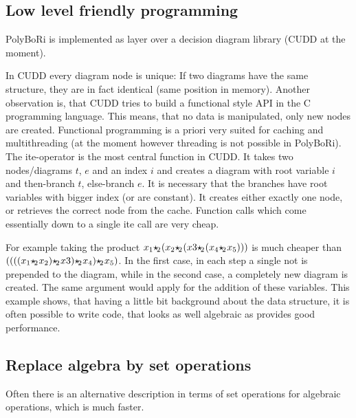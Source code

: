 \documentclass[]{article}
\newcommand{\PolyBoRi}{{\sc PolyBoRi}\xspace}
\newcommand{\CUDD}{{CUDD}\xspace}
\newcommand{\ite}{{ite}\xspace}
\providecommand{\boolemult}{\ensuremath{{\star\hspace{-.15em}_2\hspace{.05em}}}\xspace}
\begin{document}
\subsection{Low level friendly programming}
\label{low-level-friendly}
\PolyBoRi is implemented as layer over a decision diagram library (\CUDD at the moment).

In \CUDD every diagram node is unique: If two diagrams have the same structure, they are in fact identical (same position in memory).
Another observation is, that \CUDD tries to build a functional style API in the C programming language. This means, that no data is manipulated, only new nodes are created.
Functional programming is a priori very suited for caching and multithreading (at the moment however threading is not possible in \PolyBoRi).
The \ite-operator is the most central function in CUDD. It takes two nodes/diagrams $t$, $e$ and an index $i$ and creates a diagram with root variable $i$ and
then-branch $t$, else-branch $e$. It is necessary that the branches have root variables with bigger index (or are constant).
It creates either exactly one node, or retrieves the correct node from the cache.
Function calls which come essentially down to a single \ite call are very cheap.

For example taking the product $x_1 \boolemult (x_2\boolemult(x3\boolemult (x_4\boolemult x_5)))$ is much cheaper than $((((x_1 \boolemult x_2)\boolemult x3)\boolemult x_4)\boolemult x_5)$.
In the first case, in each step a single not is prepended to the diagram, while in the second case, a completely new diagram is created.
The same argument would apply for the addition of these variables.
This example shows, that having a little bit background about the data structure, it is often possible to write code, that looks as well algebraic as provides good performance.

\subsection{Replace algebra by set operations}
Often there is an alternative description in terms of set operations for algebraic operations, which is much faster.
\end{document}
